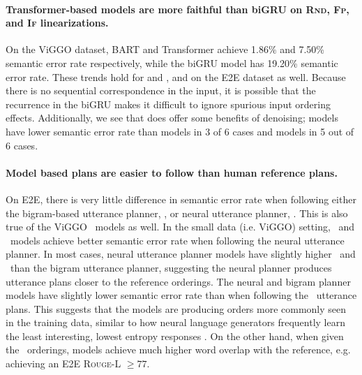 





\paragraph{Transformer-based models are more faithful than biGRU on
\textsc{Rnd, Fp}, and \textsc{If} linearizations.} On the ViGGO dataset, BART
and Transformer  achieve 1.86\% and 7.50\% semantic error rate 
respectively, while
the biGRU  model has 19.20\% semantic error rate. These trends hold for 
and , and on the E2E dataset as well. Because there is no
sequential correspondence in the input, it is possible that the recurrence in
the biGRU makes it difficult to ignore spurious input ordering effects.
Additionally, we see that  does offer some benefits of denoising;
 models have lower semantic error rate than  models in 3 of 6 cases 
and  models in 5 out of 6 cases.

\paragraph{Model based plans are easier to follow than human reference plans.
} On E2E, there is very little difference in semantic error rate when following either the
bigram-based utterance planner, \BgUP, or neural utterance planner,
\NUP. This is also true of the ViGGO \BART~models as well.  In the
small data (i.e. ViGGO) setting, \biGRU~and \Transformer~models achieve better semantic error rate when following the neural utterance planner.  In most cases,
neural utterance planner models have slightly higher \bleu~and \rougel~than
the bigram utterance planner, suggesting the neural planner produces utterance plans closer to
the reference orderings. The neural and bigram planner models have slightly lower semantic error rate
than when following the \Oracle~utterance plans.  This suggests that the models
are producing orders more commonly seen in the training data, similar to how
neural language generators frequently learn the least interesting, lowest
entropy responses \cite{serban2016}.  On the other hand, when given
the \Oracle~orderings, models achieve much higher word overlap with the
reference, e.g. achieving an E2E \textsc{Rouge-L} $\ge 77$.

